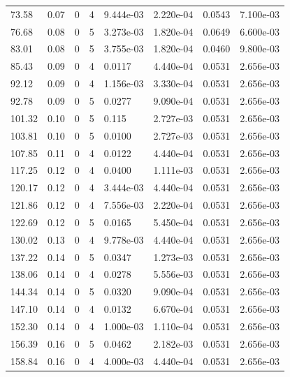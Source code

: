 \documentclass[preview]{standalone}
\begin{document}
{{\begin{tabular}{L{1.2cm}C{1.2cm} C{0.3cm}C{0.5cm} C{1.4cm}C{1.4cm} C{1.4cm}C{1.4cm}}
  73.58  &  0.07  & 0     &  4 &  9.444e-03  & 2.220e-04  & 0.0543 &  7.100e-03   \\ 
  76.68  &  0.08  & 0     &  5 &  3.273e-03  & 1.820e-04  & 0.0649 &  6.600e-03   \\ 
  83.01  &  0.08  & 0     &  5 &  3.755e-03  & 1.820e-04  & 0.0460 &  9.800e-03   \\ 
  85.43  &  0.09  & 0     &  4 &  0.0117  & 4.440e-04  & 0.0531 &  2.656e-03   \\ 
  92.12  &  0.09  & 0     &  4 &  1.156e-03  & 3.330e-04  & 0.0531 &  2.656e-03   \\ 
  92.78  &  0.09  & 0     &  5 &  0.0277  & 9.090e-04  & 0.0531 &  2.656e-03   \\ 
  101.32  &  0.10  & 0     &  5 &  0.115  & 2.727e-03  & 0.0531 &  2.656e-03   \\ 
  103.81  &  0.10  & 0     &  5 &  0.0100  & 2.727e-03  & 0.0531 &  2.656e-03   \\ 
  107.85  &  0.11  & 0     &  4 &  0.0122  & 4.440e-04  & 0.0531 &  2.656e-03   \\ 
  117.25  &  0.12  & 0     &  4 &  0.0400  & 1.111e-03  & 0.0531 &  2.656e-03   \\ 
  120.17  &  0.12  & 0     &  4 &  3.444e-03  & 4.440e-04  & 0.0531 &  2.656e-03   \\ 
  121.86  &  0.12  & 0     &  4 &  7.556e-03  & 2.220e-04  & 0.0531 &  2.656e-03   \\ 
  122.69  &  0.12  & 0     &  5 &  0.0165  & 5.450e-04  & 0.0531 &  2.656e-03   \\ 
  130.02  &  0.13  & 0     &  4 &  9.778e-03  & 4.440e-04  & 0.0531 &  2.656e-03   \\ 
  137.22  &  0.14  & 0     &  5 &  0.0347  & 1.273e-03  & 0.0531 &  2.656e-03   \\ 
  138.06  &  0.14  & 0     &  4 &  0.0278  & 5.556e-03  & 0.0531 &  2.656e-03   \\ 
  144.34  &  0.14  & 0     &  5 &  0.0320  & 9.090e-04  & 0.0531 &  2.656e-03   \\ 
  147.10  &  0.14  & 0     &  4 &  0.0132  & 6.670e-04  & 0.0531 &  2.656e-03   \\ 
  152.30  &  0.14  & 0     &  4 &  1.000e-03  & 1.110e-04  & 0.0531 &  2.656e-03   \\ 
  156.39  &  0.16  & 0     &  5 &  0.0462  & 2.182e-03  & 0.0531 &  2.656e-03   \\ 
  158.84  &  0.16  & 0     &  4 &  4.000e-03  & 4.440e-04  & 0.0531 &  2.656e-03   \\ 

\end{tabular}}}
\end{document}
